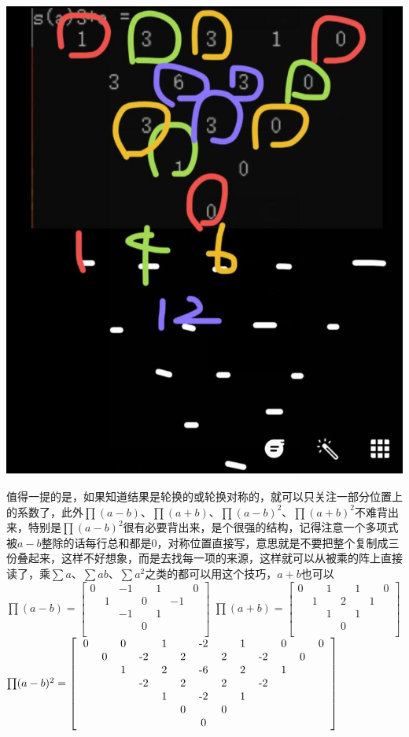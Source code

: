 \documentclass[UTF8]{ctexart}
\begin{document}
\begin{center}
	\includegraphics[width=0.35\linewidth]{09}
\end{center}
值得一提的是，如果知道结果是轮换的或轮换对称的，就可以只关注一部分位置上的系数了，此外$ \prod (a-b) $、$ \prod (a+b) $、$\prod (a-b)^{2} $、$ \prod (a+b)^{2} $不难背出来，特别是$ \prod (a-b)^{2} $很有必要背出来，是个很强的结构，记得注意一个多项式被$ a-b $整除的话每行总和都是$ 0 $，对称位置直接写，意思就是不要把整个复制成三份叠起来，这样不好想象，而是去找每一项的来源，这样就可以从被乘的阵上直接读了，乘$ \displaystyle \sum a $、$ \displaystyle \sum ab $、$ \displaystyle \sum a^{2} $之类的都可以用这个技巧，$ a+b $也可以\\
$ \prod (a-b)=\left[\begin{matrix}
	0& &-1& &1& &0\\
	&1& &0& &-1&\\
	& &-1& &1& & \\
	& & &0& & &\\
\end{matrix}\right] $
$ \prod (a+b)= \left[\begin{matrix}
	0& &1& &1& &0\\
	&1& &2& &1&\\
	& &1& &1& & \\
	& & &0& & &\\
\end{matrix}\right]$\\
$\prod (a-b)^{2}=
\left[\begin{matrix}
	\begin{tabular}{ccccccccccccc}
		0& &0& &1& &-2& &1& &0& &0\\
		&0& &-2& &2& &2& &-2& &0&\\
		& &1& &2& &-6& &2& &1& &\\
		& & &-2& &2& &2& &-2& & &\\
		& & & &1& &-2& &1& & & &\\
		& & & & &0& &0& & & & &\\
		& & & & & &0& & & & & &\\
	\end{tabular}
\end{matrix}\right]$\\
\end{document}
